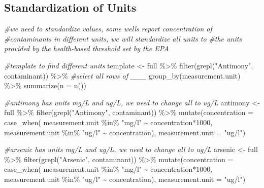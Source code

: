 \documentclass[12pt, twoside]{amherstthesis}
\newenvironment{Shaded}{\begin{snugshade}}{\end{snugshade}}
\newcommand{\AttributeTok}[1]{\textcolor[rgb]{0.77,0.63,0.00}{#1}}
\newcommand{\CommentTok}[1]{\textcolor[rgb]{0.56,0.35,0.01}{\textit{#1}}}
\newcommand{\DecValTok}[1]{\textcolor[rgb]{0.00,0.00,0.81}{#1}}
\newcommand{\FunctionTok}[1]{\textcolor[rgb]{0.00,0.00,0.00}{#1}}
\newcommand{\NormalTok}[1]{#1}
\newcommand{\OtherTok}[1]{\textcolor[rgb]{0.56,0.35,0.01}{#1}}
\newcommand{\SpecialCharTok}[1]{\textcolor[rgb]{0.00,0.00,0.00}{#1}}
\newcommand{\StringTok}[1]{\textcolor[rgb]{0.31,0.60,0.02}{#1}}
\begin{document}
\hypertarget{standardization-of-units}{%
\subsection{Standardization of Units}\label{standardization-of-units}}
\begin{Shaded}
\begin{Highlighting}[]
\CommentTok{\#we need to standardize values, some wells report concentration of}
\CommentTok{\#contaminants in different units, we will standardize all units to }
\CommentTok{\#the units provided by the health{-}based threshold set by the EPA}

\CommentTok{\#template to find different units}
\NormalTok{template }\OtherTok{\textless{}{-}}\NormalTok{ full }\SpecialCharTok{\%\textgreater{}\%}
  \FunctionTok{filter}\NormalTok{(}\FunctionTok{grepl}\NormalTok{(}\StringTok{"Antimony"}\NormalTok{, contaminant)) }\SpecialCharTok{\%\textgreater{}\%} \CommentTok{\#select all rows of \_\_\_}
  \FunctionTok{group\_by}\NormalTok{(measurement.unit) }\SpecialCharTok{\%\textgreater{}\%}
  \FunctionTok{summarize}\NormalTok{(}\AttributeTok{n =} \FunctionTok{n}\NormalTok{())}

\CommentTok{\#antimony has units mg/L and ug/L, we need to change all to ug/L}
\NormalTok{antimony }\OtherTok{\textless{}{-}}\NormalTok{ full }\SpecialCharTok{\%\textgreater{}\%}
  \FunctionTok{filter}\NormalTok{(}\FunctionTok{grepl}\NormalTok{(}\StringTok{"Antimony"}\NormalTok{, contaminant)) }\SpecialCharTok{\%\textgreater{}\%}
  \FunctionTok{mutate}\NormalTok{(}\AttributeTok{concentration =} 
           \FunctionTok{case\_when}\NormalTok{(}
\NormalTok{             measurement.unit }\SpecialCharTok{\%in\%} \StringTok{"mg/l"} \SpecialCharTok{\textasciitilde{}}\NormalTok{ concentration}\SpecialCharTok{*}\DecValTok{1000}\NormalTok{,}
\NormalTok{             measurement.unit }\SpecialCharTok{\%in\%} \StringTok{"ug/l"} \SpecialCharTok{\textasciitilde{}}\NormalTok{ concentration),}
         \AttributeTok{measurement.unit =} \StringTok{"ug/l"}\NormalTok{)}
  
\CommentTok{\#arsenic has units mg/L and ug/L, we need to change all to ug/L}
\NormalTok{arsenic }\OtherTok{\textless{}{-}}\NormalTok{ full }\SpecialCharTok{\%\textgreater{}\%}
  \FunctionTok{filter}\NormalTok{(}\FunctionTok{grepl}\NormalTok{(}\StringTok{"Arsenic"}\NormalTok{, contaminant)) }\SpecialCharTok{\%\textgreater{}\%}
  \FunctionTok{mutate}\NormalTok{(}\AttributeTok{concentration =} 
           \FunctionTok{case\_when}\NormalTok{(}
\NormalTok{             measurement.unit }\SpecialCharTok{\%in\%} \StringTok{"mg/l"} \SpecialCharTok{\textasciitilde{}}\NormalTok{ concentration}\SpecialCharTok{*}\DecValTok{1000}\NormalTok{,}
\NormalTok{             measurement.unit }\SpecialCharTok{\%in\%} \StringTok{"ug/l"} \SpecialCharTok{\textasciitilde{}}\NormalTok{ concentration),}
         \AttributeTok{measurement.unit =} \StringTok{"ug/l"}\NormalTok{)}


\end{Highlighting}
\end{Shaded}
\end{document}
